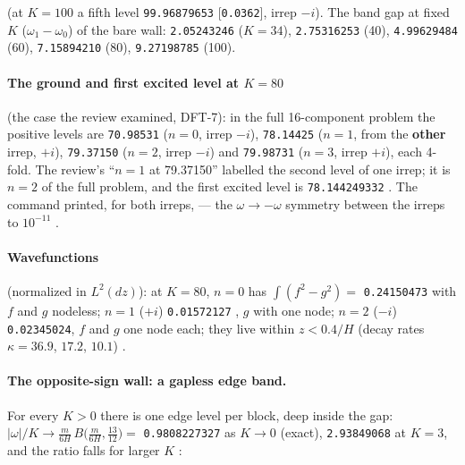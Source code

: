 (at $K=100$ a fifth level \texttt{99.96879653}  [\texttt{0.0362}], irrep $-i$). The band
gap at fixed $K$ ($\omega_1-\omega_0$) of the bare wall: \texttt{2.05243246}  ($K=34$),
\texttt{2.75316253}  (40), \texttt{4.99629484}  (60),
\texttt{7.15894210}  (80), \texttt{9.27198785} (100).

\paragraph{The ground and first excited level at $K=80$} (the case the review examined, DFT-7): in the full
16-component problem the positive levels are \texttt{70.98531}  ($n=0$, irrep $-i$),
\texttt{78.14425}  ($n=1$, from the \textbf{other} irrep, $+i$), \texttt{79.37150}
 ($n=2$, irrep $-i$) and \texttt{79.98731}  ($n=3$, irrep $+i$), each
4-fold. The review's ``$n=1$ at 79.37150'' labelled the second level of one irrep; it is $n=2$ of the full
problem, and the first excited level is \texttt{78.144249332} . The 
command printed, for both irreps,
 --- the $\omega\to-\omega$ symmetry between the irreps to $10^{-11}$ .

\paragraph{Wavefunctions} (normalized in $L^2(dz)$): at $K=80$, $n=0$ has $\int(f^2-g^2)=$ \texttt{0.24150473}
 with $f$ and $g$ nodeless; $n=1$ ($+i$) \texttt{0.01572127} , $g$ with one
node; $n=2$ ($-i$) \texttt{0.02345024}, $f$ and $g$ one node each; they live within
$z<0.4/H$ (decay rates $\kappa=36.9$, $17.2$, $10.1$) .

\paragraph{The opposite-sign wall: a gapless edge band.} For every $K>0$ there is one edge level per block,
deep inside the gap:
$|\omega|/K\to\frac{m}{6H}\,B\bigl(\frac{m}{6H},\frac{13}{12}\bigr)=$ \texttt{0.9808227327}  as
$K\to0$ (exact), \texttt{2.93849068}  at $K=3$, and the ratio falls for larger $K$
:

